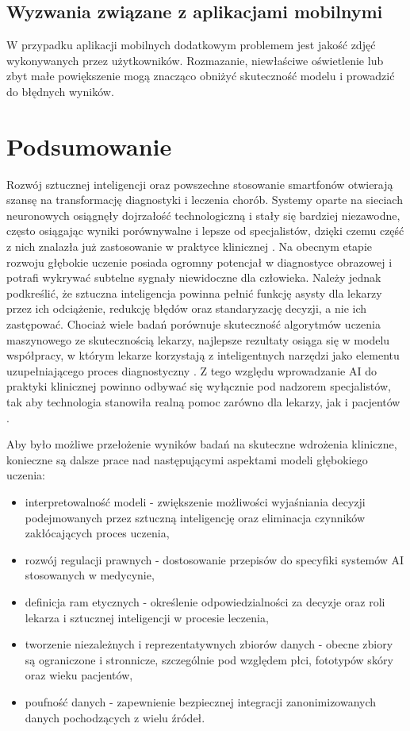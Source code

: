 \subsection{Wyzwania związane z aplikacjami mobilnymi}
W przypadku aplikacji mobilnych dodatkowym problemem jest jakość zdjęć wykonywanych przez użytkowników.
Rozmazanie, niewłaściwe oświetlenie lub zbyt małe powiększenie mogą znacząco obniżyć skuteczność modelu i prowadzić do błędnych wyników.



\section{Podsumowanie}
Rozwój sztucznej inteligencji oraz powszechne stosowanie smartfonów otwierają szansę na transformację diagnostyki i leczenia chorób.
Systemy oparte na sieciach neuronowych osiągnęły dojrzałość technologiczną i stały się bardziej niezawodne, często osiągając wyniki porównywalne i lepsze od specjalistów, dzięki czemu część z nich znalazła już zastosowanie w praktyce klinicznej \cite{Li_Koban_Schenck_Giunta_Li_Sun_2022}.
Na obecnym etapie rozwoju głębokie uczenie posiada ogromny potencjał w diagnostyce obrazowej i potrafi wykrywać subtelne sygnały niewidoczne dla człowieka.
Należy jednak podkreślić, że sztuczna inteligencja powinna pełnić funkcję asysty dla lekarzy przez ich odciążenie, redukcję błędów oraz standaryzację decyzji, a nie ich zastępować.
Chociaż wiele badań porównuje skuteczność algorytmów uczenia maszynowego ze skutecznością lekarzy, najlepsze rezultaty osiąga się w modelu współpracy, w którym lekarze korzystają z inteligentnych narzędzi jako elementu uzupełniającego proces diagnostyczny \cite{Kelly_Karthikesalingam_Suleyman_Corrado_King_2019}.
Z tego względu wprowadzanie AI do praktyki klinicznej powinno odbywać się wyłącznie pod nadzorem specjalistów, tak aby technologia stanowiła realną pomoc zarówno dla lekarzy, jak i pacjentów \cite{9113301, Kelly_Karthikesalingam_Suleyman_Corrado_King_2019}.

Aby było możliwe przełożenie wyników badań na skuteczne wdrożenia kliniczne, konieczne są dalsze prace nad następującymi aspektami modeli głębokiego uczenia:
\begin{itemize}
	\item interpretowalność modeli - zwiększenie możliwości wyjaśniania decyzji podejmowanych przez sztuczną inteligencję oraz eliminacja czynników zakłócających proces uczenia,
	\item rozwój regulacji prawnych - dostosowanie przepisów do specyfiki systemów AI stosowanych w medycynie,
	\item definicja ram etycznych - określenie odpowiedzialności za decyzje oraz roli lekarza i sztucznej inteligencji w procesie leczenia,
	\item tworzenie niezależnych i reprezentatywnych zbiorów danych - obecne zbiory są ograniczone i stronnicze, szczególnie pod względem płci, fototypów skóry oraz wieku pacjentów,
	\item poufność danych - zapewnienie bezpiecznej integracji zanonimizowanych danych pochodzących z wielu źródeł.
\end{itemize}

